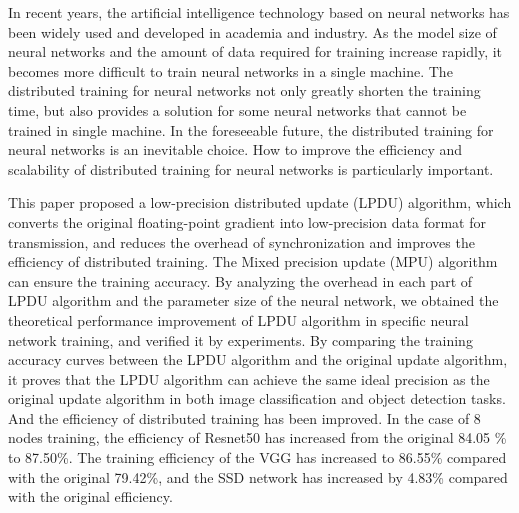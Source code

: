 \begin{eabstract}
In recent years, the artificial intelligence technology based on neural networks has been widely used and developed in academia and industry. As the model size of neural networks and the amount of data required for training increase rapidly, it becomes more difficult to train neural networks in a single machine. The distributed training for neural networks not only greatly shorten the training time, but also provides a solution for some neural networks that cannot be trained in single machine. In the foreseeable future, the distributed training for neural networks is an inevitable choice. How to improve the efficiency and scalability of distributed training for neural networks is particularly important.

This paper proposed a low-precision distributed update (LPDU) algorithm, which converts the original floating-point gradient into low-precision data format for transmission, and reduces the overhead of synchronization and improves the efficiency of distributed training. The Mixed precision update (MPU) algorithm can ensure the training accuracy. By analyzing the overhead in each part of LPDU algorithm and the parameter size of the neural network, we obtained the theoretical performance improvement of LPDU algorithm in specific neural network training, and verified it by experiments. By comparing the training accuracy curves between the LPDU algorithm and the original update algorithm, it proves that the LPDU algorithm can achieve the same ideal precision as the original update algorithm in both image classification and object detection tasks. And the efficiency of distributed training has been improved. In the case of 8 nodes training, the efficiency of Resnet50 has increased from the original 84.05 \% to 87.50\%. The training efficiency of the VGG has increased to 86.55\% compared with the original 79.42\%, and the SSD network has increased by 4.83\% compared with the original efficiency.


\end{eabstract}
